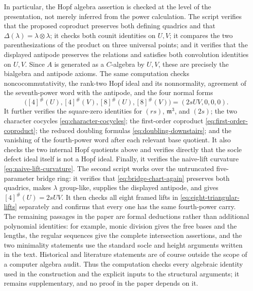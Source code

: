 \documentclass[11pt]{amsart}
\theoremstyle{definition}
\theoremstyle{remark}
\newcommand{\m}{\mathfrak m}
\newcommand{\ot}{\otimes}
\begin{document}
In particular, the Hopf algebra assertion is checked at the level of the
presentation, not merely inferred from the power calculation.  The script
verifies that the proposed coproduct preserves both defining quadrics and
that \(\Delta(\lambda)=\lambda\ot\lambda\); it checks both counit
identities on \(U,V\); it compares the two parenthesizations of the product
on three universal points; and it verifies that the displayed antipode
preserves the relations and satisfies both convolution identities on
\(U,V\).  Since \(A\) is generated as a \(C\)-algebra by \(U,V\), these
are precisely the bialgebra and antipode axioms.  The same computation
checks noncocommutativity, the rank-two Hopf ideal and its nonnormality,
agreement of the seventh-power word with the antipode, and the four normal
forms
\[
 \bigl([4]^\#(U),[4]^\#(V),[8]^\#(U),[8]^\#(V)\bigr)
 =(2sUV,0,0,0).
\]
It further verifies the square-zero identities for \((rs)\), \(\m^3\),
and \((2s)\); the two character cocycles
\eqref{eq:character-cocycles}; the first-order coproduct
\eqref{eq:first-order-coproduct}; the reduced doubling formulas
\eqref{eq:doubling-downstairs}; and the vanishing of the fourth-power word
after each relevant base quotient.  It also checks the two internal Hopf
quotients above and verifies directly that the socle defect ideal itself is
not a Hopf ideal.  Finally, it verifies the naive-lift curvature
\eqref{eq:naive-lift-curvature}.  The second script works over the
untruncated five-parameter bridge ring: it verifies that
\eqref{eq:bridge-chart-again} preserves both quadrics, makes \(\lambda\)
group-like, supplies the displayed antipode, and gives
\([4]^\#(U)=2sUV\).  It then checks all eight framed lifts in
\eqref{eq:eight-triangular-lifts} separately and confirms that every one
has the same fourth-power carry.
The remaining passages in the paper are formal deductions rather than
additional polynomial identities: for example, monic division gives the
free bases and the lengths, the regular sequences give the complete
intersection assertions, and the two minimality statements use the
standard socle and height arguments written in the text.  Historical and
literature statements are of course outside the scope of a computer
algebra audit.  Thus the computation checks every algebraic identity used
in the construction and the explicit inputs to the structural arguments;
it remains supplementary, and no proof in the paper depends on it.
\end{document}
